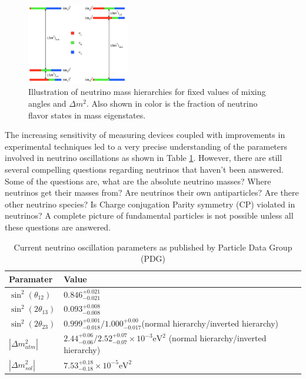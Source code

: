 \documentclass[11pt]{article}
\numberwithin{equation}{section}
\begin{document}
\begin{figure}
\centering
  \includegraphics[width=0.4\textwidth]{./hierarchy.PNG}
\caption[Neutrino mass hierarchy]{Illustration of neutrino mass hierarchies for fixed values of mixing angles and $\Delta m^2$. Also shown in color is the fraction of neutrino flavor states in mass eigenstates. \cite{Hewett2012}}
\label{fig:hierarchy}
\end{figure}

The increasing sensitivity of measuring devices coupled with improvements in experimental techniques led to a very precise understanding of the parameters involved in neutrino oscillations as shown in Table \ref{tab:oscillations}. However, there are still several compelling questions regarding neutrinos that haven't been answered. Some of the questions are, what are the absolute neutrino masses? Where neutrinos get their masses from? Are neutrinos their own antiparticles?  Are there other neutrino species? Is Charge conjugation Parity symmetry (CP) violated in neutrinos? A complete picture of fundamental particles is not possible unless all these questions are answered.


\begin{table}[h]
\centering
\begin{tabular}{ |l | l| }
\hline
  Paramater & Value  \\ \hline
  $\sin ^{2}( \theta_{12})$ & $0.846^{+0.021}_{-0.021}$ \\
  $\sin ^{2}(2 \theta_{13})$ & $0.093 ^{+0.008} _{-0.008}$ \\
  $\sin ^{2}(2 \theta_{23})$ & $0.999^{+0.001}_{-0.018}/ 1.000^{+0.00}_{-0.017} $(normal hierarchy/inverted hierarchy)\\ \hline
  $|\Delta m ^{2} _{atm}|$ & $2.44 ^{+0.06}_{-0.06} / 2.52 ^{+0.07}_{-0.07} \times 10^{-3} \text{eV}^2  $ (normal hierarchy/inverted hierarchy)\\
  $|\Delta m ^{2} _{sol}|$ & $7.53 ^{+0.18}_{-0.18} \times 10^{-5} \text{eV}^2$\\ \hline
\end{tabular}
    \caption[Neutrino oscillation parameters]{Current neutrino oscillation parameters as published by Particle Data Group (PDG) \cite{particle2004particle}}
  \label{tab:oscillations}
  \end{table}
\end{document}
